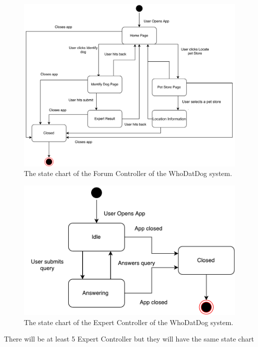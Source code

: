 \documentclass[]{article}
\begin{document}
\begin{figure}[H]
	\centering
	\includegraphics[width=\textwidth]{ForumController.jpg}
	\caption{\label{fig:analysisclassdiagram}The state chart of the Forum Controller of the WhoDatDog system.}
\end{figure}

\begin{figure}[H]
	\centering
	\includegraphics[width=\textwidth]{ExpertController.pdf}
	\caption{\label{fig:analysisclassdiagram}The state chart of the Expert Controller of the WhoDatDog system.}
\end{figure}

There will be at least  5 Expert Controller but they will have the same state chart
\end{document}
